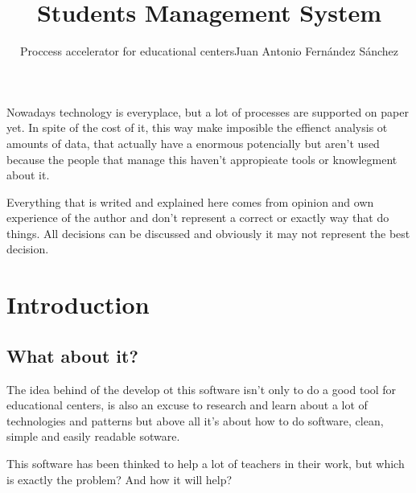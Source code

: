 \documentclass[oneside,english,titlepage]{scrbook}
\begin{document}
\title{Students Management System}

\subtitle{Proccess accelerator for educational centers}

\subtitle{Juan Antonio Fern\'andez S\'anchez}
\maketitle

Nowadays technology is everyplace, but a lot of processes are supported
on paper yet. In spite of the cost of it, this way make imposible
the effienct analysis ot amounts of data, that actually have a enormous
potencially but aren't used because the people that manage this haven't
appropieate tools or knowlegment about it.

\pagebreak{}


Everything that is writed and explained here comes from opinion and
own experience of the author and don't represent a correct or exactly
way that do things. All decisions can be discussed and obviously it
may not represent the best decision.

\pagebreak{}

\tableofcontents{}

\chapter{Introduction}

\section{What about it?}

The idea behind of the develop ot this software isn't only to do a
good tool for educational centers, is also an excuse to research and
learn about a lot of technologies and patterns but above all it's
about how to do software, clean, simple and easily readable sotware.

This software has been thinked to help a lot of teachers in their
work, but which is exactly the problem? And how it will help?
\end{document}
